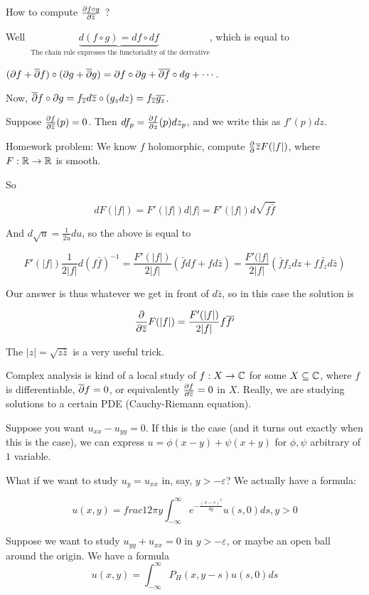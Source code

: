 \documentclass[x11names,reqno,14pt]{extarticle}
\newcommand{\oo}{{\infty}}
\begin{document}
How to compute $\frac{\partial f\circ g}{\partial \overline{z}}$ ?

Well $\underbrace{d(f\circ g) = df \circ df}_{\text{ The chain rule expresses the functoriality of the derivative}}$, which is equal to 

$(\partial f + \overline{\partial}f)\circ(\partial g + \overline{\partial}g) = \partial f \circ \partial g + \overline{\partial f}\circ dg + \cdots$.

Now, $\overline{\partial}f\circ\partial g = f_{\overline{z}}d\overline{z}\circ(g_zdz) = f_{\overline{z}}\overline{g_z}$. 


Suppose $\frac{\partial f}{\partial \overline{z}}(p) = 0$. Then $df_p = \frac{\partial f}{\partial z}(p)dz_p$, and we write this as $f'(p)dz$. 

Homework problem: We know $f$ holomorphic, compute $\frac{\partial}{\partial}{\overline{z}}F(|f|)$, where $F:\mathbb{R}\to\mathbb{R}$ is smooth. 

So 

\[
dF(|f|) = F'(|f|)d|f| = F'(|f|)d\sqrt{f\bar{f}}
\]

And $d\sqrt{u} = \frac{1}{2u}du$, so the above is equal to 

\[
F'(|f|)\frac{1}{2|f|}d(f\bar{f})^{-1} = \frac{F'(|f|)}{2|f|}(\bar{f}df + fd\bar{z}) = \frac{F'(|f|}{2|f|}(\bar{f}f_zdz + f\bar{f_z}d\bar{z})
\]

Our answer is thus whatever we get in front of $d\bar{z}$, so in this case the solution is 

\[
\frac{\partial}{\partial\overline{z}}F(|f|) = \frac{F'(|f|)}{2|f|}f\overline{f'}
\]

The $|z| = \sqrt{z\bar{z}}$ is a very useful trick. 

Complex analysis is kind of a local study of $f:X\to\mathbb{C}$ for some $X\subseteq\mathbb{C}$, where $f$ is differentiable, $\overline{\partial}f = 0$, or equivalently $\frac{\partial f}{\partial\overline{z}} = 0$ in $X$. Really, we are studying solutions to a certain PDE (Cauchy-Riemann equation). 

Suppose you want $u_{xx} - u_{yy} = 0$. If this is the case (and it turns out exactly when this is the case), we can express $u = \phi(x - y) + \psi(x + y)$ for $\phi, \psi$ arbitrary of $1$ variable. 

What if we want to study $u_y = u_{xx}$ in, say, $y > -\varepsilon$? We actually have a formula:

\[
u(x, y) = frac{1}{2\pi y}\int_{-\oo}^{\oo} e^{-\frac{(x - s)^2}{4y}}u(s, 0)ds, y > 0
\]

Suppose we want to study $u_{yy} + u_{xx} = 0$ in $y > -\varepsilon$, or maybe an open ball around the origin. We have a formula
\[
u(x, y) = \int_{-\oo}^\oo P_H(x, y - s)u(s, 0)ds
\]
\end{document}
